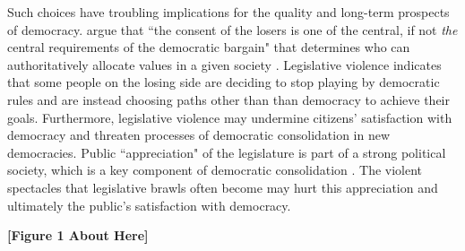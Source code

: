 \documentclass[a4paper]{article}\usepackage{graphicx, color}
\begin{document}
Such choices have troubling implications for the quality and long-term prospects of democracy. \citeauthor{Anderson2005} argue that ``the consent of the losers is one of the central, if not {\emph{the}} central requirements of the democratic bargain" that determines who can authoritatively allocate values in a given society \citeyearpar[][2-4]{Anderson2005}. Legislative violence indicates that some people on the losing side are deciding to stop playing by democratic rules and are instead choosing paths other than than democracy to achieve their goals. Furthermore, legislative violence may undermine citizens' satisfaction with democracy and threaten processes of democratic consolidation in new democracies. Public ``appreciation" of the legislature is part of a strong political society, which is a key component of democratic consolidation \citep{Stepan1996}. The violent spectacles that legislative brawls often become may hurt this appreciation and ultimately the public's satisfaction with democracy. 

\begin{center}

    {\bf{[Figure 1 About Here]}}

\end{center}
\end{document}
